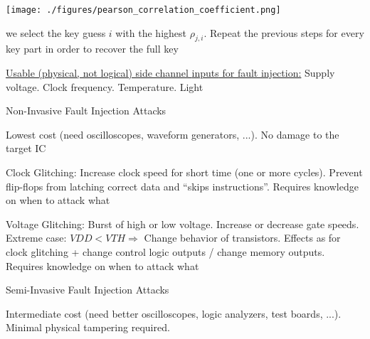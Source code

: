 \documentclass[landscape, a4paper]{article}
\begin{document}
\begin{minipage}[t]{0.2\linewidth}
\begin{betterlist}
\begin{betterlist}
\begin{betterlist}
				\texttt{[image: ./figures/pearson\_correlation\_coefficient.png]}
				\item we select the key guess $i$ with the highest $\rho_{j,i}$. Repeat the previous steps for every key part in order to recover the full key
			\end{betterlist}
		\end{betterlist}
	\end{betterlist}
	\begin{betterlist}
		\item \underline{Usable (physical, not logical) side channel \alert{inputs} for fault injection:} Supply voltage. Clock frequency. Temperature. Light
		\item \alert{Non-Invasive Fault Injection Attacks}
		\begin{betterlist}
			\item Lowest cost (need oscilloscopes, waveform generators, ...). No damage to the target IC
			\item \alert{Clock Glitching:} Increase clock speed for short time (one or more cycles). Prevent flip-flops from latching correct data and \enquote{skips instructions}. Requires knowledge on when to attack what
			\item \alert{Voltage Glitching:} Burst of high or low voltage. Increase or decrease gate speeds. Extreme case: $VDD < VTH \Rightarrow$ Change behavior of transistors. Effects as for clock glitching + change control logic outputs / change memory outputs. Requires knowledge on when to attack what
		\end{betterlist}
		\item \alert{Semi-Invasive Fault Injection Attacks}
		\begin{betterlist}
			\item Intermediate cost (need better oscilloscopes, logic analyzers, test boards, ...). Minimal physical tampering required.

\end{betterlist}
\end{betterlist}
\end{minipage}
\end{document}
